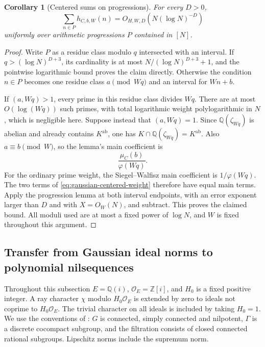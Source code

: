 \documentclass[11pt]{article}
\newtheorem{corollary}[theorem]{Corollary}
\theoremstyle{definition}
\theoremstyle{remark}
\newcommand{\Q}{\mathbb Q}
\begin{document}
\begin{corollary}[Centered sums on progressions]
\label{cor:gaussian-centered-progressions}
For every $D>0$,
\[
       \sum_{n\in P}h_{C,b,W}(n)=O_{H,W,D}(N(\log N)^{-D})
\]
uniformly over arithmetic progressions $P$ contained in $[N]$.
\end{corollary}
\begin{proof}
Write $P$ as a residue class modulo $q$ intersected with an interval.
If $q>(\log N)^{D+3}$, its cardinality is at most
$N/(\log N)^{D+3}+1$, and the pointwise logarithmic bound proves the
claim directly.  Otherwise the condition $n\in P$ becomes one residue
class $a\pmod{Wq}$ and an interval for $Wn+b$.

If $(a,Wq)>1$, every prime in this residue class divides $Wq$.  There
are at most $O(\log(Wq))$ such primes, with total logarithmic weight
polylogarithmic in $N$, which is negligible here.  Suppose instead that
$(a,Wq)=1$.
Since $\Q(\zeta_{Wq})$ is abelian and already contains
$K^{\mathrm{ab}}$, one has
$K\cap\Q(\zeta_{Wq})=K^{\mathrm{ab}}$.
Also $a\equiv b\pmod W$, so the lemma's main coefficient is
\[
   \frac{\mu_C(b)}{\varphi(Wq)}.
\]
For the ordinary prime weight, the Siegel--Walfisz main coefficient
is $1/\varphi(Wq)$.  The two terms of
\eqref{eq:gaussian-centered-weight} therefore have equal main terms.
Apply the progression lemma at both interval endpoints, with an error
exponent larger than $D$ and with $X=O_W(N)$, and subtract.  This proves
the claimed bound.  All moduli used are at most a fixed power of
$\log N$, and $W$ is fixed throughout this argument.
\end{proof}


\subsection{Transfer from Gaussian ideal norms to polynomial nilsequences}
\label{sec:gn-transfer}

Throughout this subsection $E=\mathbb Q(i)$, $\mathcal O_E=\mathbb Z[i]$,
and $H_0$ is a fixed positive integer. A ray character $\chi$ modulo
$H_0\mathcal O_E$ is extended by zero to ideals not coprime to
$H_0\mathcal O_E$. The trivial character on all ideals is included by
taking $H_0=1$. We use the conventions of \cite{GTOrbits2012}: $G$ is
connected, simply connected and nilpotent, $\Gamma$ is a discrete cocompact
subgroup, and the filtration consists of closed connected rational
subgroups. Lipschitz norms include the supremum norm.
\end{document}
